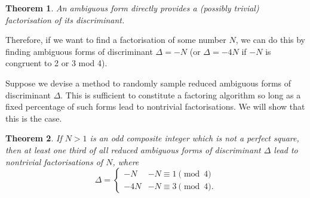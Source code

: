 \documentclass[honours,12pt]{unswthesis}
\newtheorem{theorem}{Theorem}[section]
\numberwithin{equation}{section}
\begin{document}
\vspace{2mm}
\begin{theorem}
    An ambiguous form directly provides a (possibly trivial) factorisation of its discriminant.
\end{theorem}
\vspace{2mm}

\noindent
Therefore, if we want to find a factorisation of some number $N$, we can do this by finding ambiguous forms of discriminant $\Delta = -N$
(or $\Delta = -4N$ if $-N$ is congruent to 2 or 3 mod 4).

Suppose we devise a method to randomly sample reduced ambiguous forms of discriminant $\Delta$.
This is sufficient to constitute a factoring algorithm so long as a fixed percentage of such forms lead to nontrivial factorisations.
We will show that this is the case.

\vspace{2mm}
\begin{theorem} \label{thm-ambiguous-factorisations}
    If $N > 1$ is an odd composite integer which is not a perfect square, then at least one third of all reduced ambiguous forms of discriminant $\Delta$ lead to nontrivial factorisations of $N$, where
    $$\Delta = \begin{cases}
        -N & -N \equiv 1 \pmod{4} \\
        -4N & -N \equiv 3 \pmod{4}.
    \end{cases}$$
\end{theorem}
\end{document}
